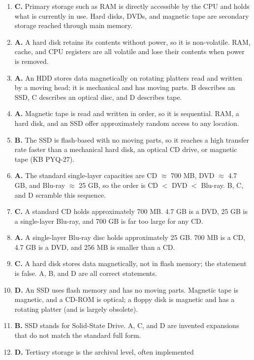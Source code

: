 \begin{enumerate}[label=\textbf{Q\arabic*.}, leftmargin=*]
\item \textbf{C.} Primary storage such as RAM is directly accessible by the
  CPU and holds what is currently in use. Hard disks, DVDs, and magnetic tape
  are secondary storage reached through main memory.
\item \textbf{A.} A hard disk retains its contents without power, so it is
  non-volatile. RAM, cache, and CPU registers are all volatile and lose their
  contents when power is removed.
\item \textbf{A.} An HDD stores data magnetically on rotating platters read
  and written by a moving head; it is mechanical and has moving parts. B
  describes an SSD, C describes an optical disc, and D describes tape.
\item \textbf{A.} Magnetic tape is read and written in order, so it is
  sequential. RAM, a hard disk, and an SSD offer approximately random access
  to any location.
\item \textbf{B.} The SSD is flash-based with no moving parts, so it reaches
  a high transfer rate faster than a mechanical hard disk, an optical CD
  drive, or magnetic tape (KB PYQ-27).
\item \textbf{A.} The standard single-layer capacities are CD $\approx$
  700 MB, DVD $\approx$ 4.7 GB, and Blu-ray $\approx$ 25 GB, so the order is
  CD $<$ DVD $<$ Blu-ray. B, C, and D scramble this sequence.
\item \textbf{C.} A standard CD holds approximately 700 MB. 4.7 GB is a DVD,
  25 GB is a single-layer Blu-ray, and 700 GB is far too large for any CD.
\item \textbf{A.} A single-layer Blu-ray disc holds approximately 25 GB.
  700 MB is a CD, 4.7 GB is a DVD, and 256 MB is smaller than a CD.
\item \textbf{C.} A hard disk stores data magnetically, not in flash memory;
  the statement is false. A, B, and D are all correct statements.
\item \textbf{D.} An SSD uses flash memory and has no moving parts. Magnetic
  tape is magnetic, and a CD-ROM is optical; a floppy disk is magnetic and
  has a rotating platter (and is largely obsolete).
\item \textbf{B.} SSD stands for Solid-State Drive. A, C, and D are invented
  expansions that do not match the standard full form.
\item \textbf{D.} Tertiary storage is the archival level, often implemented

\end{enumerate}
